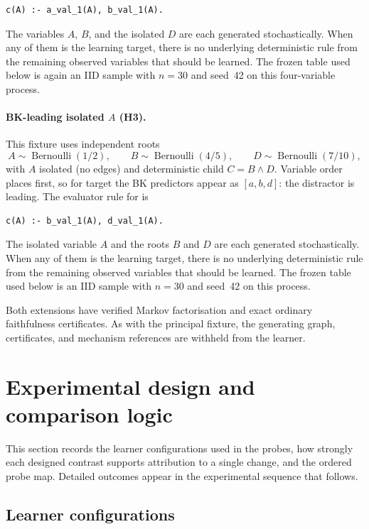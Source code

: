 \documentclass[11pt]{article}
\DeclareRobustCommand{\code}[1]{\texttt{\detokenize{#1}}}
\begin{document}
\begin{lstlisting}
c(A) :- a_val_1(A), b_val_1(A).
\end{lstlisting}

The variables \(A\), \(B\), and the isolated \(D\) are each generated
stochastically. When any of them is the learning target, there is no
underlying deterministic rule from the remaining observed variables that
should be learned. The frozen table used below is again an IID sample with
\(n=30\) and seed~42 on this four-variable process.

\paragraph{BK-leading isolated \(A\) (H3).}
This fixture uses independent roots
\[
A\sim\operatorname{Bernoulli}(1/2),\qquad
B\sim\operatorname{Bernoulli}(4/5),\qquad
D\sim\operatorname{Bernoulli}(7/10),
\]
with \(A\) isolated (no edges) and deterministic child \(C=B\land D\). Variable
order places \code{a} first, so for target \code{c} the BK predictors appear as
\([a,b,d]\): the distractor is leading. The evaluator rule for \code{c} is

\begin{lstlisting}
c(A) :- b_val_1(A), d_val_1(A).
\end{lstlisting}

The isolated variable \(A\) and the roots \(B\) and \(D\) are each generated
stochastically. When any of them is the learning target, there is no
underlying deterministic rule from the remaining observed variables that
should be learned. The frozen table used below is an IID sample with \(n=30\)
and seed~42 on this process.

Both extensions have verified Markov factorisation and exact ordinary
faithfulness certificates. As with the principal fixture, the generating
graph, certificates, and mechanism references are withheld from the learner.

\section{Experimental design and comparison logic}

This section records the learner configurations used in the probes, how
strongly each designed contrast supports attribution to a single change, and
the ordered probe map. Detailed outcomes appear in the experimental sequence
that follows.

\subsection{Learner configurations}
\end{document}
